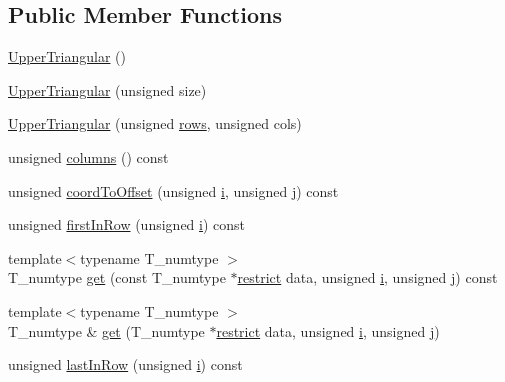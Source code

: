 \subsection*{Public Member Functions}
\begin{DoxyCompactItemize}
\item 
\hyperlink{classUpperTriangular_a903c3966499bbb5a3cc967c993eb5151}{Upper\+Triangular} ()
\item 
\hyperlink{classUpperTriangular_a2b2d339def21734b15303c27b3f9744b}{Upper\+Triangular} (unsigned size)
\item 
\hyperlink{classUpperTriangular_a149c92f7b48608c313b5cfa3dcb61305}{Upper\+Triangular} (unsigned \hyperlink{classUpperTriangular_aeb2fa8962cd3af4d5101279fa29e6cdf}{rows}, unsigned cols)
\item 
unsigned \hyperlink{classUpperTriangular_acc79e6952297e448d67580913332e346}{columns} () const 
\item 
unsigned \hyperlink{classUpperTriangular_a0ae047a32d07c300fe52fa65bdaa913c}{coord\+To\+Offset} (unsigned \hyperlink{indexexpr_8h_aabd77643995707c185e95c8cb2782c81}{i}, unsigned \hyperlink{indexexpr_8h_aa1f3325d66516548e69238097857fa98}{j}) const 
\item 
unsigned \hyperlink{classUpperTriangular_a35f33c462e10d00350f4a3b69840a10e}{first\+In\+Row} (unsigned \hyperlink{indexexpr_8h_aabd77643995707c185e95c8cb2782c81}{i}) const 
\item 
{\footnotesize template$<$typename T\+\_\+numtype $>$ }\\T\+\_\+numtype \hyperlink{classUpperTriangular_adc6cd62e24f5b402b111ef8cfe146f15}{get} (const T\+\_\+numtype $\ast$\hyperlink{compiler_8h_a080abdcb9c02438f1cd2bb707af25af8}{restrict} data, unsigned \hyperlink{indexexpr_8h_aabd77643995707c185e95c8cb2782c81}{i}, unsigned \hyperlink{indexexpr_8h_aa1f3325d66516548e69238097857fa98}{j}) const 
\item 
{\footnotesize template$<$typename T\+\_\+numtype $>$ }\\T\+\_\+numtype \& \hyperlink{classUpperTriangular_a45992554ef361fc6109312bfdd26d225}{get} (T\+\_\+numtype $\ast$\hyperlink{compiler_8h_a080abdcb9c02438f1cd2bb707af25af8}{restrict} data, unsigned \hyperlink{indexexpr_8h_aabd77643995707c185e95c8cb2782c81}{i}, unsigned \hyperlink{indexexpr_8h_aa1f3325d66516548e69238097857fa98}{j})
\item 
unsigned \hyperlink{classUpperTriangular_a9b0a17a32b8955f88e5217d54ae27df4}{last\+In\+Row} (unsigned \hyperlink{indexexpr_8h_aabd77643995707c185e95c8cb2782c81}{i}) const 

\end{DoxyCompactItemize}
